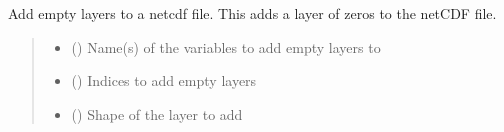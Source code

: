 \documentclass[letterpaper,10pt,english]{sphinxmanual}
\begin{document}
\begin{fulllineitems}
\label{\detokenize{misc:glomar_gridding.utils.add_empty_layers}}
\pysigstartsignatures
\pysiglinewithargsret
{}
{\sphinxparamcomma {}\sphinxparamcomma {}}
{}
\pysigstopsignatures
\sphinxAtStartPar
Add empty layers to a netcdf file. This adds a layer of zeros to the netCDF
file.
\begin{quote}\begin{description}
\begin{itemize}
\item {}
\sphinxAtStartPar
{} (\sphinxstyleliteralemphasis{\sphinxupquote{{[}}}\sphinxstyleliteralemphasis{\sphinxupquote{{]} }}\sphinxstyleliteralemphasis{\sphinxupquote{| }}) \textendash{} Name(s) of the variables to add empty layers to

\item {}
\sphinxAtStartPar
{} (\sphinxstyleliteralemphasis{\sphinxupquote{{[}}}\sphinxstyleliteralemphasis{\sphinxupquote{{]} }}\sphinxstyleliteralemphasis{\sphinxupquote{| }}) \textendash{} Indices to add empty layers

\item {}
\sphinxAtStartPar
{} (\sphinxstyleliteralemphasis{\sphinxupquote{{[}}}\sphinxstyleliteralemphasis{\sphinxupquote{, }}\sphinxstyleliteralemphasis{\sphinxupquote{{]}}}) \textendash{} Shape of the layer to add

\end{itemize}

\sphinxAtStartPar
{}

\end{description}\end{quote}

\end{fulllineitems}
\end{document}
